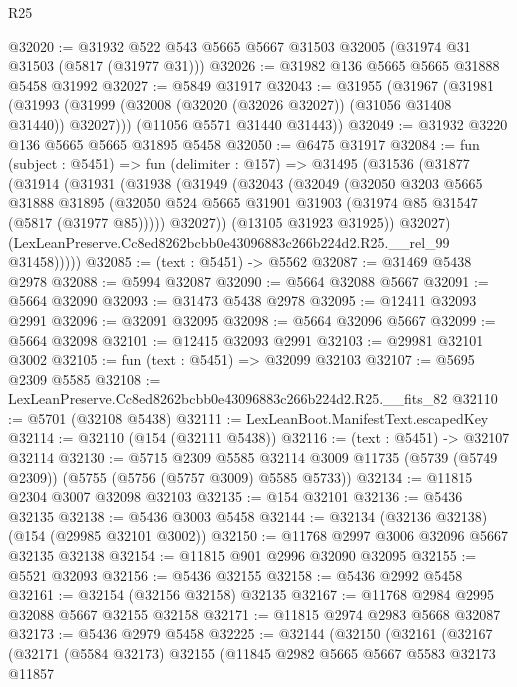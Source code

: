 \begin{lexlean}{R25}
\begin{coremodule}
@32020 := @31932 @522 @543 @5665 @5667 @31503 @32005 (@31974 @31 @31503 (@5817 (@31977 @31)))
@32026 := @31982 @136 @5665 @5665 @31888 @5458 @31992
@32027 := @5849 @31917
@32043 := @31955
    (@31967
      (@31981 (@31993 (@31999 (@32008 (@32020 (@32026 @32027)) (@31056 @31408 @31440)) @32027)))
      (@11056 @5571 @31440 @31443))
@32049 := @31932 @3220 @136 @5665 @5665 @31895 @5458
@32050 := @6475 @31917
@32084 := fun (subject : @5451) =>
  fun (delimiter : @157) =>
  @31495
    (@31536
      (@31877
        (@31914
          (@31931
            (@31938
              (@31949
                (@32043
                  (@32049
                    (@32050
                      @3203
                      @5665
                      @31888
                      @31895
                      (@32050 @524 @5665 @31901 @31903 (@31974 @85 @31547 (@5817 (@31977 @85)))))
                    @32027))
                (@13105 @31923 @31925))
              @32027)
            (LexLeanPreserve.Cc8ed8262bcbb0e43096883c266b224d2.R25.__rel_99 @31458)))))
@32085 := (text : @5451) -> @5562
@32087 := @31469 @5438 @2978
@32088 := @5994 @32087
@32090 := @5664 @32088 @5667
@32091 := @5664 @32090
@32093 := @31473 @5438 @2978
@32095 := @12411 @32093 @2991
@32096 := @32091 @32095
@32098 := @5664 @32096 @5667
@32099 := @5664 @32098
@32101 := @12415 @32093 @2991
@32103 := @29981 @32101 @3002
@32105 := fun (text : @5451) => @32099 @32103
@32107 := @5695 @2309 @5585
@32108 := LexLeanPreserve.Cc8ed8262bcbb0e43096883c266b224d2.R25.__fits_82
@32110 := @5701 (@32108 @5438)
@32111 := LexLeanBoot.ManifestText.escapedKey
@32114 := @32110 (@154 (@32111 @5438))
@32116 := (text : @5451) -> @32107 @32114
@32130 := @5715
    @2309
    @5585
    @32114
    @3009
    @11735
    (@5739 (@5749 @2309))
    (@5755 (@5756 (@5757 @3009) @5585 @5733))
@32134 := @11815 @2304 @3007 @32098 @32103
@32135 := @154 @32101
@32136 := @5436 @32135
@32138 := @5436 @3003 @5458
@32144 := @32134 (@32136 @32138) (@154 (@29985 @32101 @3002))
@32150 := @11768 @2997 @3006 @32096 @5667 @32135 @32138
@32154 := @11815 @901 @2996 @32090 @32095
@32155 := @5521 @32093
@32156 := @5436 @32155
@32158 := @5436 @2992 @5458
@32161 := @32154 (@32156 @32158) @32135
@32167 := @11768 @2984 @2995 @32088 @5667 @32155 @32158
@32171 := @11815 @2974 @2983 @5668 @32087
@32173 := @5436 @2979 @5458
@32225 := @32144
    (@32150
      (@32161
        (@32167
          (@32171
            (@5584 @32173)
            @32155
            (@11845
              @2982
              @5665
              @5667
              @5583
              @32173
              @11857

\end{coremodule}
\end{lexlean}
